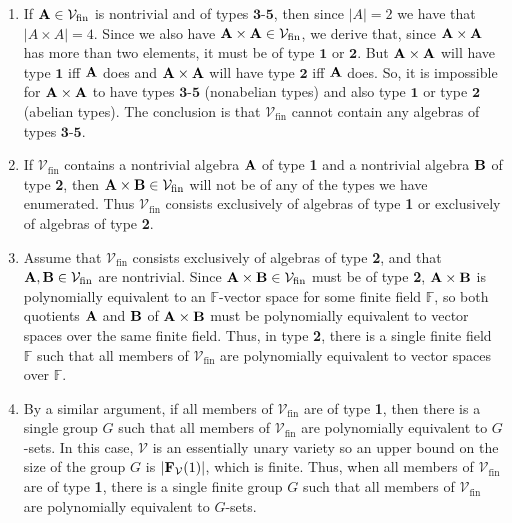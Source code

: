 \documentclass[12pt]{amsart}
\theoremstyle{definition}
\numberwithin{equation}{section}
\newcommand{\m}[1]{{\mathbf{\uppercase{#1}}}}
\begin{document}
\begin{enumerate}
\item If $\m a\in {\mathcal V}_{\textrm{fin}}$ is nontrivial and of types
$\mathbf{3}$-$\mathbf{5}$, then since $|A|=2$ we have
that $|A\times A|=4$. Since we also have
$\m a\times \m a\in {\mathcal V}_{\textrm{fin}}$, we derive
that, since $\m a\times \m a$ has more than two elements,
it must be of
type $\mathbf{1}$ or $\mathbf{2}$. But $\m a\times \m a$ will have type
$\mathbf{1}$ iff $\m a$ does and $\m a\times \m a$ will have type
$\mathbf{2}$ iff $\m a$ does. So, it is impossible for $\m a\times\m a$
to have types $\mathbf{3}$-$\mathbf{5}$ (nonabelian types) and also
type $\mathbf{1}$ or type $\mathbf{2}$ (abelian types).
The conclusion is that ${\mathcal V}_{\textrm{fin}}$
cannot contain any algebras of types $\mathbf{3}$-$\mathbf{5}$.
\smallskip

\item If ${\mathcal V}_{\textrm{fin}}$ contains a nontrivial algebra $\m a$
  of type {\bf 1} and a nontrivial algebra $\m b$
  of type {\bf 2}, then $\m a\times \m b\in {\mathcal V}_{\textrm{fin}}$
  will not be of any of the types we have enumerated.
  Thus
  ${\mathcal V}_{\textrm{fin}}$
  consists exclusively of algebras of type {\bf 1}
  or exclusively of algebras of type {\bf 2}.
\smallskip

\item
Assume that ${\mathcal V}_{\textrm{fin}}$
consists exclusively of algebras of type {\bf 2},
and that $\m a, \m b\in {\mathcal V}_{\textrm{fin}}$ are nontrivial.
Since $\m a\times \m b\in {\mathcal V}_{\textrm{fin}}$
must be of type {\bf 2},
$\m a\times \m b$ is polynomially equivalent to an
$\mathbb F$-vector space for some finite field $\mathbb{F}$,
so both quotients $\m a$ and $\m b$ of
$\m a\times \m b$ must be polynomially equivalent to
vector spaces over the same finite field. Thus, in type {\bf 2},
there is a single finite field $\mathbb F$ such that
all members of ${\mathcal V}_{\textrm{fin}}$
are polynomially equivalent to vector spaces over $\mathbb F$.
\smallskip

\item
By a similar argument, if all members of
${\mathcal V}_{\textrm{fin}}$ are of type {\bf 1},
then there is a single group $G$
such that all members of 
${\mathcal V}_{\textrm{fin}}$ are polynomially equivalent
to $G$-sets. In this case, $\mathcal V$ is an essentially unary
variety so an upper bound on the size of the group $G$ is
$|\m f_{\mathcal V}(1)|$, which is finite. Thus,
when all members of
${\mathcal V}_{\textrm{fin}}$ are of type {\bf 1},    
there is a single finite group $G$ such that
all members of ${\mathcal V}_{\textrm{fin}}$ are
polynomially equivalent
  to $G$-sets. 
\end{enumerate}  
\smallskip
\end{document}
